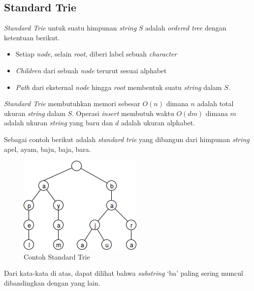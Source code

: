 \subsection{Standard Trie} \label{sec:trie}
\textit{Standard Trie} untuk suatu himpunan \textit{string} $S$ adalah \textit{ordered tree} dengan ketentuan berikut.
\begin{itemize}
  \item Setiap \textit{node}, selain \textit{root}, diberi label sebuah \textit{character}
  \item \textit{Children} dari sebuah \textit{node} terurut sesuai alphabet
  \item \textit{Path} dari eksternal \textit{node} hingga \textit{root} membentuk suatu \textit{string} dalam $S$.
\end{itemize}
\textit{Standard Trie} membutuhkan memori sebesar $O(n)$ dimana $n$ adalah total ukuran \textit{string} dalam $S$. Operasi \textit{insert} membutuh waktu $O(dm)$ dimana $m$ adalah ukuran \textit{string} yang baru dan $d$ adalah ukuran alphabet.

Sebagai contoh berikut adalah \textit{standard trie} yang dibangun dari himpunan \textit{string} {apel, ayam, baju, baja, bara}.
\begin{figure}
    \centering
    \includegraphics[scale=0.6]{pics/Contoh-StandardTrie}
    \caption{Contoh Standard Trie}
    \label{fig:contoh-standard-trie}
\end{figure}

\noindent Dari kata-kata di atas, dapat dilihat bahwa \textit{substring} `ba' paling sering muncul dibandingkan dengan yang lain.

